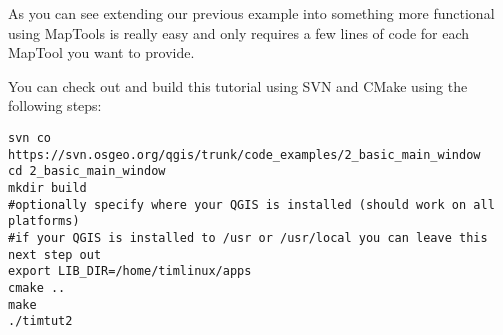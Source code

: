 
As you can see extending our previous example into something more functional
using MapTools is really easy and only requires a few lines of code for each
MapTool you want to provide.

You can check out and build this tutorial using SVN and CMake using the following steps:

\begin{verbatim}
svn co https://svn.osgeo.org/qgis/trunk/code_examples/2_basic_main_window
cd 2_basic_main_window
mkdir build
#optionally specify where your QGIS is installed (should work on all platforms)
#if your QGIS is installed to /usr or /usr/local you can leave this next step out
export LIB_DIR=/home/timlinux/apps
cmake ..
make
./timtut2
\end{verbatim}


